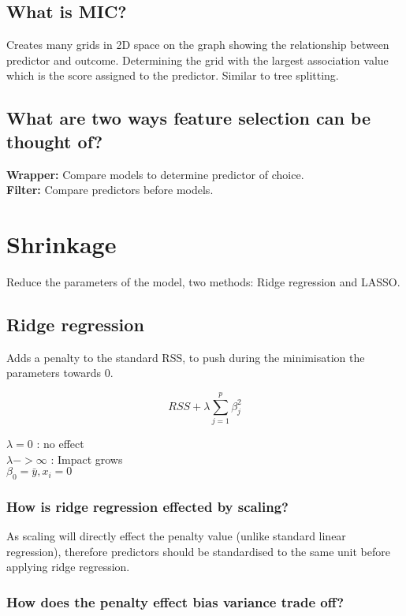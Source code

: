 \documentclass[11pt]{scrartcl} %
\begin{document}
\subsection{What is MIC?}

Creates many grids in 2D space on the graph showing the relationship between predictor and outcome. Determining the
grid with the largest association value which is the score assigned to the predictor. Similar to tree splitting.

\subsection{What are two ways feature selection can be thought of?}

\textbf{Wrapper:} Compare models to determine predictor of choice.\\
\textbf{Filter:} Compare predictors before models.

\section{Shrinkage}

Reduce the parameters of the model, two methods: Ridge regression and LASSO.

\subsection{Ridge regression}

Adds a penalty to the standard RSS, to push during the minimisation the parameters towards 0.

\begin{equation}
	RSS + \lambda \sum^p_{j=1}{\beta^2_j}
\end{equation}

\(\lambda =0\) : no effect\\
\(\lambda ->\infty \) : Impact grows\\
\(\beta_0 = \bar{y},x_i=0\) 

\subsubsection{How is ridge regression effected by scaling?}

As scaling will directly effect the penalty value (unlike standard linear regression), therefore
predictors should be standardised to the same unit before applying ridge regression.

\subsubsection{How does the penalty effect bias variance trade off?}
\end{document}
